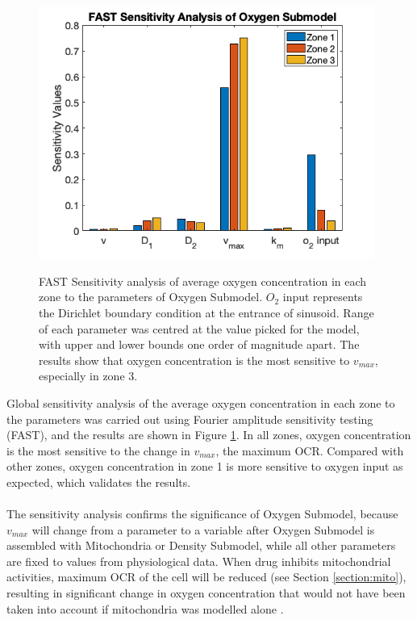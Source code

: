 \documentclass[12pt]{article}
\begin{document}
\begin{figure}[h!]
\centering
\includegraphics[width = 11cm, height = 9cm]{sens.png}
\caption{FAST Sensitivity analysis of average oxygen concentration in each zone to the parameters of Oxygen Submodel. $O_2$ input represents the Dirichlet boundary condition at the entrance of sinusoid. Range of each parameter was centred at the value picked for the model, with upper and lower bounds one order of magnitude apart. The results show that oxygen concentration is the most sensitive to $v_{max}$, especially in zone 3.}
\label{fig:sens}
\end{figure}
Global sensitivity analysis of the average oxygen concentration in each zone to the parameters was carried out using Fourier amplitude sensitivity testing (FAST), and the results are shown in Figure \ref{fig:sens}. In all zones, oxygen concentration is the most sensitive to the change in $v_{max}$, the maximum OCR. Compared with other zones, oxygen concentration in zone 1 is more sensitive to oxygen input as expected, which validates the results.\\\\
The sensitivity analysis confirms the significance of Oxygen Submodel, because $v_{max}$ will change from a parameter to a variable after Oxygen Submodel is assembled with Mitochondria or Density Submodel, while all other parameters are fixed to values from physiological data. When drug inhibits mitochondrial activities, maximum OCR of the cell will be reduced (see Section \ref{section:mito}), resulting in significant change in oxygen concentration that would not have been taken into account if mitochondria was modelled alone \cite{y.yangMITOsymMechanisticMathematical2015}.
\end{document}
